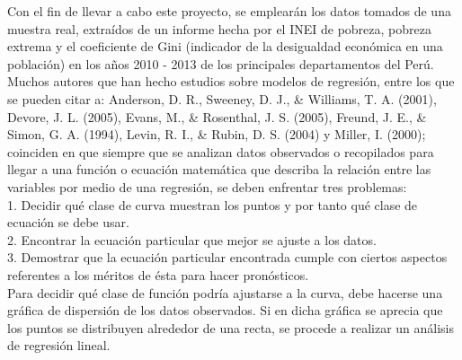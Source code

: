 \documentclass[twocolumn,twoside]{article}
\begin{document}
Con el fin de llevar a cabo este proyecto, se emplearán los datos tomados de una muestra real, 
extra\'idos de un informe hecha por el INEI de pobreza, pobreza extrema y el coeficiente de
Gini (indicador de la desigualdad econ\'omica en una poblaci\'on) en los años 2010 - 2013 de los
principales departamentos del Per\'u.\\

Muchos autores que han hecho estudios sobre
modelos de regresi\'on, entre los que se pueden
citar a: Anderson, D. R., Sweeney, D. J., \& Williams,
T. A. (2001), Devore, J. L. (2005), Evans, M., \&
Rosenthal, J. S. (2005), Freund, J. E., \& Simon,
G. A. (1994), Levin, R. I., \& Rubin, D. S. (2004)
y Miller, I. (2000); coinciden en que siempre que
se analizan datos observados o recopilados para 
llegar a una funci\'on o ecuaci\'on matem\'atica que
describa la relaci\'on entre las variables por medio de
una regresi\'on, se deben enfrentar tres problemas:\\
1. Decidir qu\'e clase de curva muestran los puntos
y por tanto qu\'e clase de ecuaci\'on se debe usar.\\
2. Encontrar la ecuaci\'on particular que mejor se
ajuste a los datos.\\
3. Demostrar que la ecuaci\'on particular encontrada
cumple con ciertos aspectos referentes a los méritos 
de \'esta para hacer pron\'osticos.\\

Para decidir qu\'e clase de funci\'on podr\'ia ajustarse
a la curva, debe hacerse una gr\'afica de dispersi\'on
de los datos observados. Si en dicha gr\'afica se aprecia 
que los puntos se distribuyen alrededor de una recta, se 
procede a realizar un an\'alisis de regresi\'on lineal.
\end{document}

